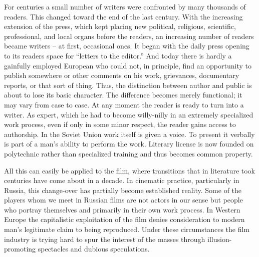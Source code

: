 \documentclass[11pt, letterpaper]{article}
\begin{document}
For centuries a small number of writers were confronted by many thousands of
readers. This changed toward the end of the last century. With the increasing
extension of the press, which kept placing new political, religious,
scientific, professional, and local organs before the readers, an increasing
number of readers became writers – at first, occasional ones. It began with the
daily press opening to its readers space for “letters to the editor.” And today
there is hardly a gainfully employed European who could not, in principle, find
an opportunity to publish somewhere or other comments on his work, grievances,
documentary reports, or that sort of thing. Thus, the distinction between
author and public is about to lose its basic character. The difference becomes
merely functional; it may vary from case to case. At any moment the reader is
ready to turn into a writer. As expert, which he had to become willy-nilly in
an extremely specialized work process, even if only in some minor respect, the
reader gains access to authorship. In the Soviet Union work itself is given a
voice. To present it verbally is part of a man’s ability to perform the work.
Literary license is now founded on polytechnic rather than specialized training
and thus becomes common property.

All this can easily be applied to the film, where transitions that in
literature took centuries have come about in a decade. In cinematic practice,
particularly in Russia, this change-over has partially become established
reality. Some of the players whom we meet in Russian films are not actors in
our sense but people who portray themselves and primarily in their own work
process. In Western Europe the capitalistic exploitation of the film denies
consideration to modern man’s legitimate claim to being reproduced. Under these
circumstances the film industry is trying hard to spur the interest of the
masses through illusion-promoting spectacles and dubious speculations.

\section{}
\end{document}
